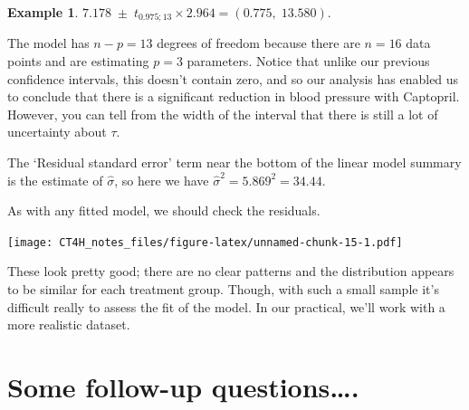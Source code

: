 \documentclass[
  openany]{book}
\newenvironment{Shaded}{\begin{snugshade}}{\end{snugshade}}
\newcommand{\AttributeTok}[1]{\textcolor[rgb]{0.13,0.29,0.53}{#1}}
\newcommand{\DecValTok}[1]{\textcolor[rgb]{0.00,0.00,0.81}{#1}}
\newcommand{\FunctionTok}[1]{\textcolor[rgb]{0.13,0.29,0.53}{\textbf{#1}}}
\newcommand{\NormalTok}[1]{#1}
\newcommand{\OtherTok}[1]{\textcolor[rgb]{0.56,0.35,0.01}{#1}}
\newcommand{\SpecialCharTok}[1]{\textcolor[rgb]{0.81,0.36,0.00}{\textbf{#1}}}
\newcommand{\StringTok}[1]{\textcolor[rgb]{0.31,0.60,0.02}{#1}}
\theoremstyle{definition}
\theoremstyle{definition}
\newtheorem{example}{Example}[chapter]
\theoremstyle{definition}
\theoremstyle{definition}
\theoremstyle{remark}
\begin{document}
\begin{example}
\(7.178\; \pm\; t_{0.975;13}\times{2.964} = \left(0.775,\; 13.580\right).\)

The model has \(n-p=13\) degrees of freedom because there are \(n=16\) data points and are estimating \(p=3\) parameters.
Notice that unlike our previous confidence intervals, this doesn't contain zero, and so our analysis has enabled us to conclude that there is a significant reduction in blood pressure with Captopril. However, you can tell from the width of the interval that there is still a lot of uncertainty about \(\tau\).

The `Residual standard error' term near the bottom of the linear model summary is the estimate of \(\hat{\sigma}\), so here we have \(\hat{\sigma}^2 = 5.869^2 = 34.44.\)

As with any fitted model, we should check the residuals.

\begin{Shaded}
\end{Shaded}

\texttt{[image: CT4H\_notes\_files/figure-latex/unnamed-chunk-15-1.pdf]}

These look pretty good; there are no clear patterns and the distribution appears to be similar for each treatment group. Though, with such a small sample it's difficult really to assess the fit of the model. In our practical, we'll work with a more realistic dataset.
\end{example}

\hypertarget{some-follow-up-questions.}{%
\section{Some follow-up questions\ldots.}\label{some-follow-up-questions.}}
\end{document}
